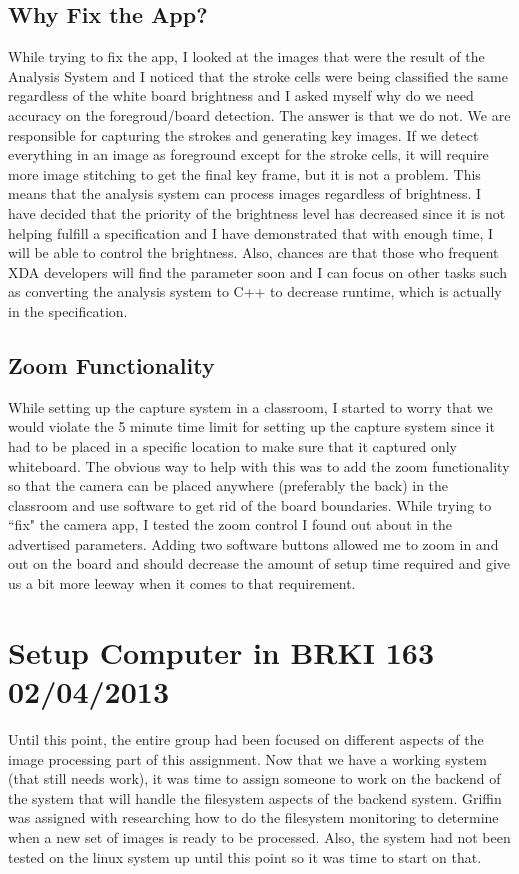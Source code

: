 \documentclass[]{article}
\begin{document}
		\subsection{Why Fix the App?}
			While trying to fix the app, I looked at the images that were the result of the Analysis System and I noticed that the stroke cells were being classified the same regardless of the white board brightness and I asked myself why do we need accuracy on the foregroud/board detection. The answer is that we do not. We are responsible for capturing the strokes and generating key images. If we detect everything in an image as foreground except for the stroke cells, it will require more image stitching to get the final key frame, but it is not a problem. This means that the analysis system can process images regardless of brightness. I have decided that the priority of the brightness level has decreased since it is not helping fulfill a specification and I have demonstrated that with enough time, I will be able to control the brightness. Also, chances are that those who frequent XDA developers will find the parameter soon and I can focus on other tasks such as converting the analysis system to C++ to decrease runtime, which is actually in the specification. 
			
		\subsection{Zoom Functionality}
			While setting up the capture system in a classroom, I started to worry that we would violate the 5 minute time limit for setting up the capture system since it had to be placed in a specific location to make sure that it captured only whiteboard. The obvious way to help with this was to add the zoom functionality so that the camera can be placed anywhere (preferably the back) in the classroom and use software to get rid of the board boundaries. While trying to ``fix" the camera app, I tested the zoom control I found out about in the advertised parameters. Adding two software buttons allowed me to zoom in and out on the board and should decrease the amount of setup time required and give us a bit more leeway when it comes to that requirement.
	

    	\section{Setup Computer in BRKI 163 02/04/2013}
		Until this point, the entire group had been focused on different aspects of the image processing part of this assignment. Now that we have a working system (that still needs work), it was time to assign someone to work on the backend of the system that will handle the filesystem aspects of the backend system. Griffin was assigned with researching how to do the filesystem monitoring to determine when a new set of images is ready to be processed. Also, the system had not been tested on the linux system up until this point so it was time to start on that.
\end{document}
